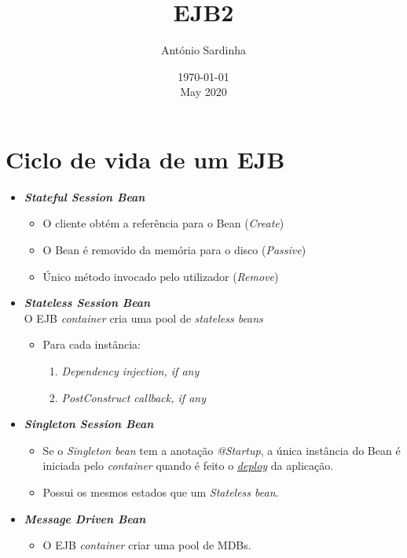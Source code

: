 \documentclass{article}
\date{\today \\ \currenttime}
\title{EJB2}
\author{António Sardinha}
\date{May 2020}
\begin{document}
\maketitle

\section{Ciclo de vida de um EJB}
\begin{itemize}
    \item \textit{\textbf{Stateful Session Bean}}
    \begin{itemize}
        \item O cliente obtém a referência para o Bean (\textit{Create})
        \item O Bean é removido da memória para o disco (\textit{Passive})
        \item Único método invocado pelo utilizador (\textit{Remove})
    \end{itemize}
    \item \textit{\textbf{Stateless Session Bean}}\\
    O EJB \textit{container} cria uma pool de \textit{stateless beans}
    \begin{itemize}
        \item Para cada instância:
        \begin{enumerate}
            \item \textit{Dependency injection, if any}
            \item \textit{PostConstruct callback, if any}
        \end{enumerate}
    \end{itemize}
    \item \textit{\textbf{Singleton Session Bean}}
    \begin{itemize}
        \item Se o \textit{Singleton bean} tem a anotação \textit{@Startup}, a única instância do Bean é iniciada pelo \textit{container} quando é feito o \textit{\underline{deploy}} da aplicação.
        \item Possui os mesmos estados que um \textit{Stateless bean}.
    \end{itemize}
    \item \textit{\textbf{Message Driven Bean}}
    \begin{itemize}
        \item O EJB \textit{container} criar uma pool de MDBs.
    \end{itemize}
\end{itemize}
\end{document}
